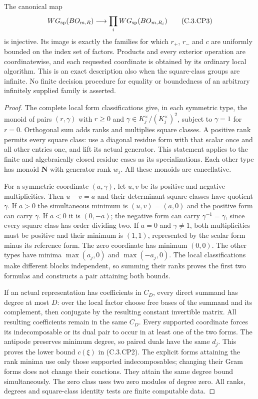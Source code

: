 \begin{theorem}
The canonical map
\[
 WG_{\rm sp}(BO_{m,R})\longrightarrow
                    \prod_iWG_{\rm sp}(BO_{m,R_i})       \tag{C.3.CP3}
\]
is injective.  Its image is exactly the families
for which $r_+$, $r_-$ and $c$ are uniformly
bounded on the index set of factors.
Products and every exterior operation are
coordinatewise, and each requested coordinate
is obtained by its ordinary local algorithm.
This is an exact description also when the
square-class groups are infinite.  No finite
decision procedure for equality or boundedness
of an arbitrary infinitely supplied family
is asserted.
\end{theorem}
\begin{proof}
The complete local form classifications give,
in each symmetric type, the monoid of pairs
$(r,\gamma)$ with $r\geq0$ and
$\gamma\in K_j^\times/(K_j^\times)^2$,
subject to $\gamma=1$ for $r=0$.
Orthogonal sum adds ranks and multiplies
square classes.  A positive rank permits
every square class: use a diagonal residue
form with that scalar once and all other
entries one, and lift its actual generator.
This statement applies to the finite
and algebraically closed residue cases
as its specializations.
Each other type has monoid $\mathbf N$
with generator rank $w_j$.
All these monoids are cancellative.

For a symmetric coordinate $(a,\gamma)$,
let $u,v$ be its positive and negative
multiplicities.  Then $u-v=a$ and
their determinant square classes have
quotient $\gamma$.
If $a>0$ the simultaneous minimum is
$(u,v)=(a,0)$ and the positive form
can carry $\gamma$.
If $a<0$ it is $(0,-a)$; the negative
form can carry $\gamma^{-1}=\gamma$,
since every square class has order
dividing two.
If $a=0$ and $\gamma\ne1$, both
multiplicities must be positive and
their minimum is $(1,1)$, represented
by the scalar form minus its reference
form.  The zero coordinate has minimum
$(0,0)$.
The other types have minima
$\max(a_j,0)$ and $\max(-a_j,0)$.
The local classifications make
different blocks independent, so
summing their ranks proves the
first two formulas and constructs
a pair attaining both bounds.

If an actual representation has
coefficients in $C_D$, every direct
summand has degree at most $D$:
over the local factor choose free
bases of the summand and its
complement, then conjugate by
the resulting constant invertible
matrix.  All resulting coefficients
remain in the same $C_D$.
Every supported coordinate forces
its indecomposable or its dual
pair to occur in at least one
of the two forms.
The antipode preserves minimum
degree, so paired duals have
the same $d_j$.
This proves the lower bound
$c(\xi)$ in (C.3.CP2).
The explicit forms attaining
the rank minima use only those
supported indecomposables;
changing their Gram forms
does not change their coactions.
They attain the same degree
bound simultaneously.
The zero class uses two
zero modules of degree zero.
All ranks, degrees and
square-class identity tests
are finite computable data.


\end{proof}
